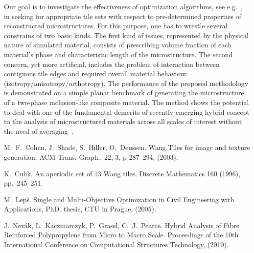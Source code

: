 Our goal is to investigate the effectiveness of optimization algorithms, see e.g.~\cite{Leps05}, in seeking for appropriate tile sets with respect to pre-determined properties of reconstructed microstructures. For this purpose, one has to wrestle several constrains of two basic kinds. The first kind of issues, represented by the physical nature of simulated material, consists of prescribing volume fraction of each material's phase and characteristic length of the microstructure. The second concern, yet more artificial, includes the problem of interaction between contiguous tile edges and required overall material behaviour (isotropy/anisotropy/orthotropy). The performance of the proposed methodology is demonstrated on a simple planar benchmark of generating the microstructure of a two-phase inclusion-like composite material. The method shows the potential to deal with one of the fundamental demerits of recently emerging hybrid concept to the analysis of microstructured materials across all scales of interest without the need of averaging~\cite{Novak10}. 


\begin{thebibliography}{10}
{\sc M.~F.~Cohen, J.~Shade, S.~Hiller, O.~Deussen}. {Wang Tiles for image and texture generation}. ACM Trans. Graph., 22, 3, p 287--294, (2003).

{\sc K.~Culik}. {An aperiodic set of 13 Wang tiles}. Discrete Mathematics 160 (1996), pp.~245--251.

{\sc M.~Lep\v{s}}. {Single and Multi-Objective Optimization in Civil Engineering with Applications}, PhD. thesis, CTU in Prague, (2005).

{\sc J.~Nov\'{a}k, \L.~Kaczmarczyk, P.~Grassl, C.~J.~Pearce}. {Hybrid Analysis of Fibre Reinforced Polypropylene from Micro to Macro Scale}. Proceedings of the 10th International Conference on Computational Structures Technology, (2010).
\end{thebibliography}